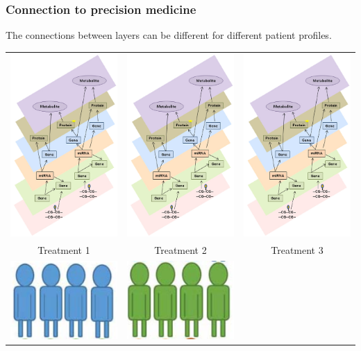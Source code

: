 \documentclass[10pt]{beamer}
\theoremstyle{definition}
\begin{document}
\begin{frame}
\frametitle{Connection to precision medicine}
The connections between layers can be different for different patient profiles.

\begin{center}
\begin{scriptsize}
\begin{tabular}{ccc}
\includegraphics[width=.2\textwidth]{multi-omics1}
\vspace{.5em}
& \includegraphics[width=.2\textwidth]{multi-omics1}
\vspace{.5em}
& \includegraphics[width=.2\textwidth]{multi-omics1}
\vspace{.5em}\\
Treatment 1 & Treatment 2 & Treatment 3\\
\includegraphics[width=.2\textwidth]{profile1}
\vspace{.5em}
& \includegraphics[width=.2\textwidth]{profile2}

\end{tabular}
\end{scriptsize}
\end{center}
\end{frame}
\end{document}
